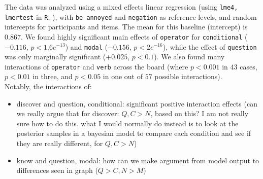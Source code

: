 \documentclass[12pt, a4paper]{scrartcl}
\begin{document}
	\vspace{-.3\baselineskip}

	\noindent The data was analyzed using a mixed effects linear regression (using \texttt{lme4, lmertest} in \texttt{R}; \citealp{bates_fitting_2015,kuznetsova_lmertest_2016,r_core_team_r_2014}), with \texttt{be annoyed} and \texttt{negation} as reference levels, and random intercepts for participants and items. The mean for this baseline (intercept) is $0.867$. We found highly significant main effects of \texttt{operator} for \texttt{conditional} ($-0.116$, $p < 1.6e^{-13}$) and \texttt{modal} ($-0.156$, $p < 2e^{-16}$), while the effect of \texttt{question} was only marginally significant ($+0.025$, $p < 0.1$). We also found many interactions of \texttt{operator} and \texttt{verb} across the board (where $p < 0.001$ in $43$ cases, $p < 0.01$ in three, and $p < 0.05$ in one out of $57$ possible interactions).\\

	Notably, the interactions of:
	\begin{itemize}
		\item discover and question, conditional: significant positive interaction effects (can we really argue that for discover: $Q, C > N$, based on this? I am not really sure how to do this. what I would normally do instead is to look at the posterior samples in a bayesian model to compare each condition and see if they are really different, for $Q, C > N$)

		\item know and question, modal: how can we make argument from model output to differences seen in graph ($Q > C, N > M$)

	\end{itemize}
	
\end{document}
